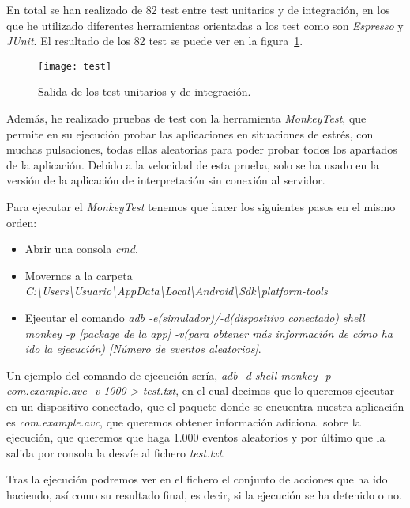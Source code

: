 En total se han realizado de 82 test entre test unitarios y de integración, en los que he utilizado diferentes herramientas orientadas a los test como son \textit{Espresso} y \textit{JUnit}. El resultado de los 82 test se puede ver en la figura~\ref{fig:test}.
\begin{figure}
	\centering
	\texttt{[image: test]}
	\caption{Salida de los test unitarios y de integración.}
	\label{fig:test}
\end{figure}

Además, he realizado pruebas de test con la herramienta \textit{MonkeyTest}, que permite en su ejecución probar las aplicaciones en situaciones de estrés, con muchas pulsaciones, todas ellas aleatorias para poder probar todos los apartados de la aplicación. Debido a la velocidad de esta prueba, solo se  ha usado en la versión de la aplicación de interpretación sin conexión al servidor.

Para ejecutar el \textit{MonkeyTest} tenemos que hacer los siguientes pasos en el mismo orden:
\begin{itemize}
	\item Abrir una consola \textit{cmd}.
	\item Movernos a la carpeta \textit{C:\textbackslash Users\textbackslash Usuario\textbackslash AppData\textbackslash Local\textbackslash Android\textbackslash Sdk\textbackslash platform-tools}
	\item Ejecutar el comando \textit{adb -e(simulador)/-d(dispositivo conectado) shell monkey -p [package de la app] -v(para obtener más información de cómo ha ido la ejecución) [Número de eventos aleatorios]}.
\end{itemize}

Un ejemplo del comando de ejecución sería, \textit{adb -d shell monkey -p com.example.avc -v 1000 > test.txt}, en el cual decimos que lo queremos ejecutar en un dispositivo conectado, que el paquete donde se encuentra nuestra aplicación es \textit{com.example.avc}, que queremos obtener información adicional sobre la ejecución, que queremos que haga 1.000 eventos aleatorios y por último que la salida por consola la desvíe al fichero \textit{test.txt}.

Tras la ejecución podremos ver en el fichero el conjunto de acciones que ha ido haciendo, así como su resultado final, es decir, si la ejecución se ha detenido o no.